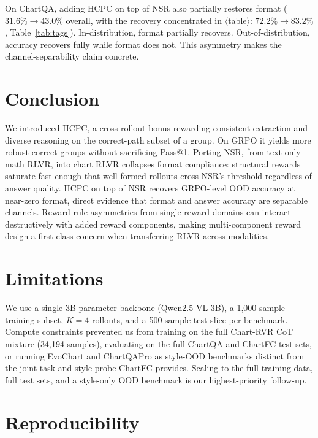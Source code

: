 \documentclass[11pt]{article}
\begin{document}
On ChartQA, adding HCPC on top of NSR also partially restores format
($31.6\%\!\to\!43.0\%$ overall, with the recovery concentrated in
$\langle$table$\rangle$: $72.2\%\!\to\!83.2\%$, Table~\ref{tab:tags}).
In-distribution, format partially recovers. Out-of-distribution,
accuracy recovers fully while format does not. This asymmetry makes
the channel-separability claim concrete.

\section{Conclusion}
We introduced HCPC, a cross-rollout bonus rewarding consistent
extraction and diverse reasoning on the correct-path subset of a
group. On GRPO it yields more robust correct groups without
sacrificing Pass@1. Porting NSR, from text-only math RLVR, into chart RLVR collapses format
compliance: structural rewards saturate fast enough that well-formed
rollouts cross NSR's threshold regardless of answer quality. HCPC
on top of NSR recovers GRPO-level OOD accuracy at near-zero format,
direct evidence that format and answer accuracy are separable
channels. Reward-rule asymmetries from single-reward domains can interact destructively with added reward components, making multi-component reward design a first-class concern when transferring RLVR across modalities.



\section*{Limitations}

We use a single 3B-parameter backbone (Qwen2.5-VL-3B), a 1{,}000-sample
training subset, $K{=}4$ rollouts, and a 500-sample test slice per
benchmark. Compute constraints prevented us from training on the full
Chart-RVR CoT mixture (34{,}194 samples), evaluating on the full
ChartQA and ChartFC test sets, or running EvoChart \citep{evochart}
and ChartQAPro \citep{chartqapro} as style-OOD benchmarks distinct
from the joint task-and-style probe ChartFC provides. Scaling to the
full training data, full test sets, and a style-only OOD benchmark is
our highest-priority follow-up.


\appendix

\section{Reproducibility}
\label{sec:appendix}
\end{document}
